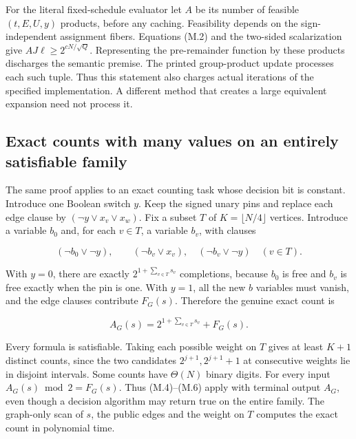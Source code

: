 \documentclass[
  11pt,
]{article}
\begin{document}
For the literal fixed-schedule evaluator let \(A\) be its number of
feasible \((t,E,U,y)\) products, before any caching. Feasibility depends
on the sign-independent assignment fibers. Equations (M.2) and the
two-sided scalarization give \(AJ\ell\ge2^{cN/\sqrt Q}\). Representing
the pre-remainder function by these products discharges the semantic
premise. The printed group-product update processes each such tuple.
Thus this statement also charges actual iterations of the specified
implementation. A different method that creates a large equivalent
expansion need not process it.

\subsection{Exact counts with many values on an entirely satisfiable
family}\label{exact-counts-with-many-values-on-an-entirely-satisfiable-family}

The same proof applies to an exact counting task whose decision bit is
constant. Introduce one Boolean switch \(y\). Keep the signed unary pins
and replace each edge clause by \((\neg y\lor x_v\lor x_w)\). Fix a
subset \(T\) of \(K=\lfloor N/4\rfloor\) vertices. Introduce a variable
\(b_0\) and, for each \(v\in T\), a variable \(b_v\), with clauses

\[
 (\neg b_0\lor\neg y),\qquad
 (\neg b_v\lor x_v),\quad(\neg b_v\lor\neg y)\quad(v\in T).
\]

With \(y=0\), there are exactly \(2^{1+\sum_{v\in T}s_v}\) completions,
because \(b_0\) is free and \(b_v\) is free exactly when the pin is one.
With \(y=1\), all the new \(b\) variables must vanish, and the edge
clauses contribute \(F_G(s)\). Therefore the genuine exact count is

\[
 A_G(s)=2^{1+\sum_{v\in T}s_v}+F_G(s).
\tag{M.7}
\]

Every formula is satisfiable. Taking each possible weight on \(T\) gives
at least \(K+1\) distinct counts, since the two candidates
\(2^{j+1},2^{j+1}+1\) at consecutive weights lie in disjoint intervals.
Some counts have \(\Theta(N)\) binary digits. For every input
\(A_G(s)\bmod2=F_G(s)\). Thus (M.4)--(M.6) apply with terminal output
\(A_G\), even though a decision algorithm may return true on the entire
family. The graph-only scan of \(s\), the public edges and the weight on
\(T\) computes the exact count in polynomial time.
\end{document}

